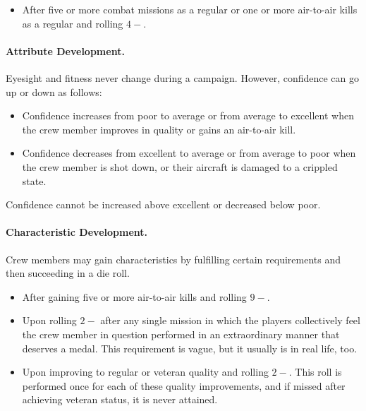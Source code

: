 \begin{advancedrules}
{\begin{itemize}
    \item {} After five or more combat missions as a regular or one or more air-to-air kills as a regular and rolling $4-$.

\end{itemize}

\paragraph{Attribute Development.} Eyesight and fitness never change during a campaign. However, confidence can go up or down as follows:
\begin{itemize}

    \item Confidence increases from poor to average or from average to excellent when the crew member improves in quality or gains an air-to-air kill. 

    \item Confidence decreases from excellent to average or from average to poor when the crew member is shot down, or their aircraft is damaged to a crippled state. 

\end{itemize}

Confidence cannot be increased above excellent or decreased below poor.

\paragraph{Characteristic Development.}

Crew members may gain characteristics by fulfilling certain requirements and then succeeding in a die roll. 

\begin{itemize}

    \item {} After gaining five or more air-to-air kills and rolling $9-$.


    \item {} Upon rolling $2-$ after any single mission in which the players collectively feel the crew member in question performed in an extraordinary manner that deserves a medal. This requirement is vague, but it usually is in real life, too.

    \item {} Upon improving to regular or veteran quality and rolling $2-$. This roll is performed once for each of these quality improvements, and if missed after achieving veteran status, it is never attained.


\end{itemize}}
\end{advancedrules}
